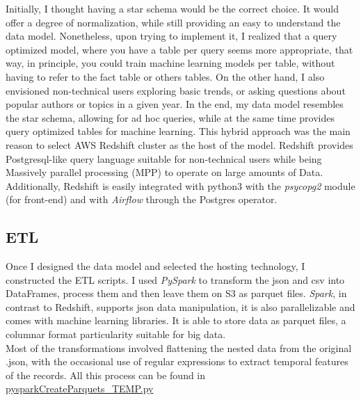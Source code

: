 Initially, I thought having a star schema would be the correct choice. It would offer a degree of normalization, while still providing an easy to understand the data model. Nonetheless, upon trying to implement it, I realized that a query optimized model, where you have a table per query seems more appropriate, that way, in principle, you could train machine learning models per table, without having to refer to the fact table or others tables. On the other hand, I also envisioned non-technical users exploring basic trends, or asking questions about popular authors or topics in a given year. In the end, my data model resembles the star schema, allowing for ad hoc queries, while at the same time provides query optimized tables for machine learning. This hybrid approach was the main reason to select AWS Redshift cluster as the host of the model. Redshift provides Postgresql-like query language suitable for non-technical users while being Massively parallel processing (MPP) to operate on large amounts of Data. Additionally, Redshift is easily integrated with python3 with the \emph{psycopg2} module (for front-end) and with \emph{Airflow} through the Postgres operator.

\subsection{ETL}
Once I designed the data model and selected the hosting technology, I constructed the ETL scripts. I used \emph{PySpark} to transform the json and csv into DataFrames, process them and then leave them on S3 as parquet files. \emph{Spark}, in contrast to Redshift, supports json data manipulation, it is also parallelizable and comes with machine learning libraries. It is able to store data as parquet files, a columnar format particularity suitable for big data.\\

Most of the transformations involved flattening the nested data from the original .json, with the occasional use of regular expressions to extract temporal features of the records. All this process can be found in \href{https://github.com/gariciodaro/arXiv-haystack-app/blob/master/back_end/scripts/pysparkCreateParquets_TEMP.py}{pysparkCreateParquets\_TEMP.py}

